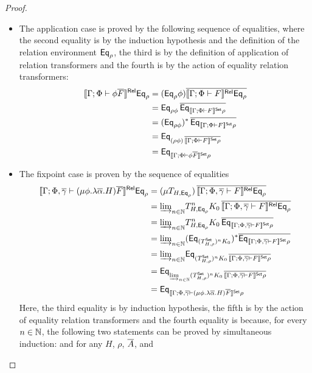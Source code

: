 \documentclass[runningheads]{llncs}
\newcommand{\set}{\mathsf{Set}}
\begin{document}
\begin{proof}
\begin{itemize}
\item The application case is proved by the following sequence of
  equalities, where the second equality is by the induction hypothesis
  and the definition of the relation environment $\mathsf{Eq}_\rho$, the third
  is by the definition of application of relation transformers 
  and the fourth is by the action of equality relation transformers:
\[
\begin{split}
\relsem{\Gamma; \Phi \vdash \phi\ol{F}}\Eq_{\rho} &=
(\Eq_{\rho}\phi)\ol{\relsem{\Gamma; \Phi \vdash F}
\Eq_{\rho}}\\
&= \Eq_{\rho \phi}\, \ol{\Eq_{\setsem{\Gamma; \Phi \vdash F}
  \rho}}\\
&= (\Eq_{\rho \phi})^* \,\ol{\Eq_{\setsem{\Gamma; \Phi \vdash F}
  \rho}}\\
&= \Eq_{(\rho \phi) \,\ol{\setsem{\Gamma; \Phi \vdash F} \rho}}\\
&= \Eq_{\setsem{\Gamma; \Phi \vdash \phi\ol{F}}\rho}
\end{split}
\]
\item 
  The fixpoint case is proven by the sequence of equalities
\[
\begin{split}
\relsem{\Gamma; \Phi, \ol\gamma \vdash (\mu \phi.\lambda
  \ol{\alpha}. H)\ol{F}}\Eq_{\rho} 
&=(\mu {T_{H, \Eq_{\rho}}}) \,\ol{\relsem{\Gamma; \Phi, \ol\gamma  \vdash F}\Eq_{\rho}}\\ 
&= \colim{n \in \nat}{T^n_{H, \Eq_{\rho}} K_0}\, \ol{\relsem{\Gamma; \Phi, \ol\gamma 
  \vdash F}\Eq_{\rho}}\\
&= \colim{n \in \nat}{ T^n_{H, \Eq_{\rho}} K_0 \,\ol{\Eq_{\setsem{\Gamma;
    \Phi, \ol\gamma  \vdash F}\rho}}}\\
&= \colim{n \in \nat}{(\Eq_{(T^\set_{H,\rho})^n K_0})^*
  \ol{\Eq_{\setsem{\Gamma; \Phi, \ol\gamma  \vdash F}\rho}}}\\
&= \colim{n \in \nat}{\Eq_{(T^\set_{H,\rho})^n K_0 \,\ol{\setsem{\Gamma;
        \Phi, \ol\gamma  \vdash F}\rho}}}\\ 
&= \Eq_{\colim{n \in \nat}{ (T^\set_{H,\rho})^n K_0\,
    \ol{\setsem{\Gamma; \Phi, \ol\gamma  \vdash F}\rho}}}\\
&= \Eq_{\setsem{\Gamma; \Phi, \ol\gamma  \vdash (\mu \phi.\lambda
      \ol{\alpha}. H)\ol{F}}\rho}
\end{split}
\]
Here, the third equality is by induction hypothesis, the fifth is by
the action of equality relation transformers and the fourth equality is
because, for every $n \in \mathbb{N}$, the following two statements can be
proved by simultaneous induction: and for any $H$, $\rho$, $\overline{A}$, and

\end{itemize}
\end{proof}
\end{document}
